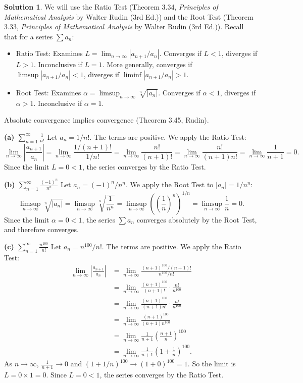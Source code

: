 \documentclass[12pt,oneside]{article}
\theoremstyle{definition}
\newtheorem*{solution}{Solution} %
\newcommand{\rudin}{\textit{Principles of Mathematical Analysis} by Walter Rudin (3rd Ed.)}
\begin{document}
\begin{solution}
We will use the Ratio Test (Theorem 3.34, \rudin{}) and the Root Test (Theorem 3.33, \rudin{}). Recall that for a series $\sum a_n$:
\begin{itemize}
    \item Ratio Test: Examines $L = \lim_{n\to\infty} |a_{n+1}/a_n|$. Converges if $L < 1$, diverges if $L > 1$. Inconclusive if $L=1$. More generally, converges if $\limsup |a_{n+1}/a_n| < 1$, diverges if $\liminf |a_{n+1}/a_n| > 1$.
    \item Root Test: Examines $\alpha = \limsup_{n\to\infty} \sqrt[n]{|a_n|}$. Converges if $\alpha < 1$, diverges if $\alpha > 1$. Inconclusive if $\alpha=1$.
\end{itemize}
Absolute convergence implies convergence (Theorem 3.45, Rudin).

\medskip

\textbf{(a) $\displaystyle \sum_{n=1}^{\infty} \frac{1}{n!}$}
Let $a_n = 1/n!$. The terms are positive. We apply the Ratio Test:
\[
\lim_{n\to\infty} \left| \frac{a_{n+1}}{a_n} \right| = \lim_{n\to\infty} \frac{1/(n+1)!}{1/n!} = \lim_{n\to\infty} \frac{n!}{(n+1)!} = \lim_{n\to\infty} \frac{n!}{(n+1)n!} = \lim_{n\to\infty} \frac{1}{n+1} = 0.
\]
Since the limit $L=0 < 1$, the series converges by the Ratio Test.

\medskip

\textbf{(b) $\displaystyle \sum_{n=1}^{\infty} \frac{(-1)^n}{n^n}$}
Let $a_n = (-1)^n / n^n$. We apply the Root Test to $|a_n| = 1/n^n$:
\[
\limsup_{n\to\infty} \sqrt[n]{|a_n|} = \limsup_{n\to\infty} \sqrt[n]{\frac{1}{n^n}} = \limsup_{n\to\infty} \left( \left(\frac{1}{n}\right)^n \right)^{1/n} = \limsup_{n\to\infty} \frac{1}{n} = 0.
\]
Since the limit $\alpha=0 < 1$, the series $\sum a_n$ converges absolutely by the Root Test, and therefore converges.

\medskip

\textbf{(c) $\displaystyle \sum_{n=1}^{\infty} \frac{n^{100}}{n!}$}
Let $a_n = n^{100}/n!$. The terms are positive. We apply the Ratio Test:
\begin{align*}
\lim_{n\to\infty} \left| \frac{a_{n+1}}{a_n} \right| &= \lim_{n\to\infty} \frac{(n+1)^{100}/(n+1)!}{n^{100}/n!} \\
&= \lim_{n\to\infty} \frac{(n+1)^{100}}{(n+1)!} \cdot \frac{n!}{n^{100}} \\
&= \lim_{n\to\infty} \frac{(n+1)^{100}}{(n+1)n!} \cdot \frac{n!}{n^{100}} \\
&= \lim_{n\to\infty} \frac{(n+1)^{100}}{(n+1)n^{100}} \\
&= \lim_{n\to\infty} \frac{1}{n+1} \left( \frac{n+1}{n} \right)^{100} \\
&= \lim_{n\to\infty} \frac{1}{n+1} \left( 1 + \frac{1}{n} \right)^{100}.
\end{align*}
As $n\to\infty$, $\frac{1}{n+1} \to 0$ and $(1 + 1/n)^{100} \to (1+0)^{100} = 1$.
So the limit is $L = 0 \times 1 = 0$.
Since $L=0 < 1$, the series converges by the Ratio Test.


\end{solution}
\end{document}
